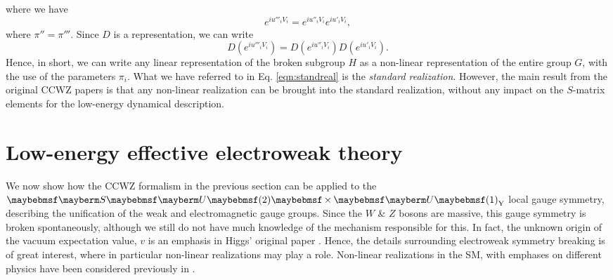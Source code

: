 where we have
\begin{equation}
e^{i u'''_i V_i} = e^{i u''_i V_i}e^{i u'_i V_i},
\end{equation}
where $\pi''=\pi'''$. Since $D$ is a representation, we can write
\begin{equation}
D\left( e^{i u'''_i V_i} \right) = D\left( e^{i u''_i V_i} \right) D\left( e^{i u'_i V_i} \right).
\end{equation}
Hence, in short, we can write any linear representation of the broken subgroup $H$ as a non-linear representation of the entire group $G$, with the use of the parameters $\pi_i$. What we have referred to in Eq. \ref{eqn:standreal} is the \textit{standard realization}. However, the main result from the original CCWZ papers \cite{RN642,RN643} is that any non-linear realization can be brought into the standard realization, without any impact on the $S$-matrix elements for the low-energy dynamical description.

\section{Low-energy effective electroweak theory}
\label{sec:SMhiggssector}

We now show how the CCWZ formalism in the previous section can be applied to the $\SUgroup{2} \times \Ugroup{1}_{\text{Y}}$ local gauge symmetry, describing the unification of the weak and electromagnetic gauge groups. Since the $W$ \& $Z$ bosons are massive, this gauge symmetry is broken spontaneously, although we still do not have much knowledge of the mechanism responsible for this. In fact, the unknown origin of the vacuum expectation value, $v$ is an emphasis in Higgs' original paper \cite{RN668}. Hence, the details surrounding electroweak symmetry breaking is of great interest, where in particular non-linear realizations may play a role. Non-linear realizations in the SM, with emphases on different physics have been considered previously in \cite{RN206,RN666,RN667}.

